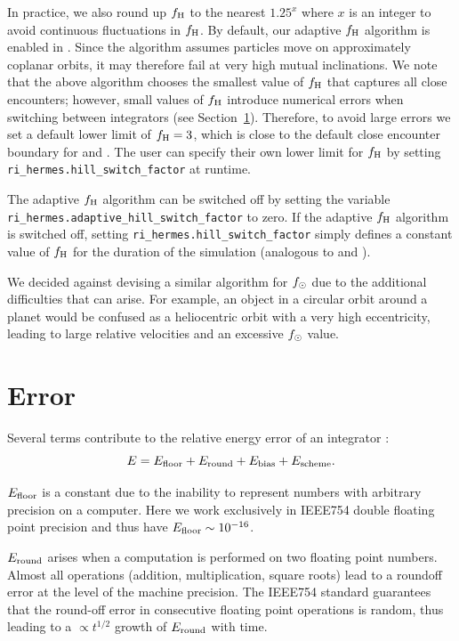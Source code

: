 In practice, we also round up $f_{\rm H}$ to the nearest $1.25^x$ where $x$ is an integer to avoid continuous fluctuations in $f_{\rm H}$. 
By default, our adaptive $f_{\rm H}$ algorithm is enabled in \hermes.
Since the algorithm assumes particles move on approximately coplanar orbits, it may therefore fail at very high mutual inclinations.
We note that the above algorithm chooses the smallest value of $f_{\rm H}$ that captures all close encounters; however, small values of $f_{\rm H}$ introduce numerical errors when switching between integrators (see Section~\ref{sec:Error}).
Therefore, to avoid large errors we set a default lower limit of $f_{\rm H}=3$, which is close to the default close encounter boundary for \mercury and \symba.
The user can specify their own lower limit for $f_{\rm H}$ by setting {\sc \tt ri\_hermes.hill\_switch\_factor} at runtime. 

The adaptive $f_{\rm H}$ algorithm can be switched off by setting the variable {\sc \tt ri\_hermes.adaptive\_hill\_switch\_factor} to zero.
If the adaptive $f_{\rm H}$ algorithm is switched off, setting {\sc \tt ri\_hermes.hill\_switch\_factor} simply defines a constant value of $f_{\rm H}$ for the duration of the simulation (analogous to \mercury and \symba). 

We decided against devising a similar algorithm for $f_{\rm \odot}$ due to the additional difficulties that can arise. 
For example, an object in a circular orbit around a planet would be confused as a heliocentric orbit with a very high eccentricity, leading to large relative velocities and an excessive $f_{\rm \odot}$ value. 

\section{Error}
\label{sec:Error}
Several terms contribute to the relative energy error of an integrator \citep[e.g.][]{Rein2015a}:
\begin{equation}
E = E_{\rm floor} + E_{\rm round}  + E_{\rm bias} + E_{\rm scheme}.
\label{eq:error}
\end{equation}

$E_{\rm floor}$ is a constant due to the inability to represent numbers with arbitrary precision on a computer.  
Here we work exclusively in IEEE754 double floating point precision and thus have $E_{\rm floor}\sim 10^{-16}$. 

$E_{\rm round}$ arises when a computation is performed on two floating point numbers. 
Almost all operations (addition, multiplication, square roots) lead to a roundoff error at the level of the machine precision.
The IEEE754 standard guarantees that the round-off error in consecutive floating point operations is random, thus leading to a $\propto t^{1/2}$ growth of $E_{\rm round}$ with time.

